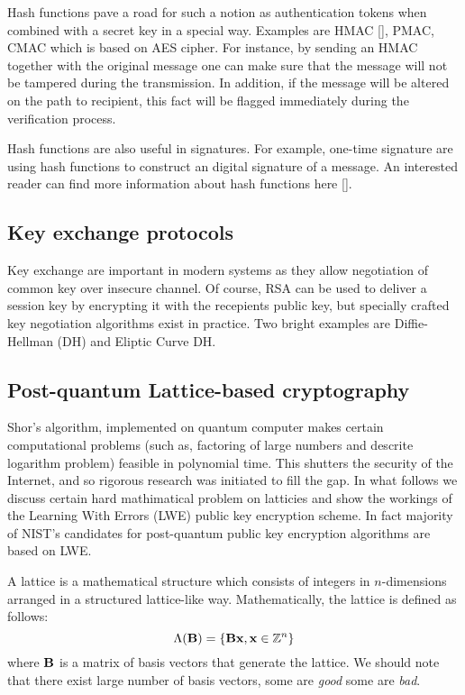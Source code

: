 Hash functions pave a road for such a notion as authentication tokens when combined with a 
secret key in a special way. Examples are HMAC [], PMAC, CMAC which is based on AES cipher. 
For instance, by sending an HMAC together with the original message one can make sure that 
the message will not be tampered during the transmission. In addition, if the message will 
be altered on the path to recipient, this fact will be flagged immediately during the 
verification process.

Hash functions are also useful in signatures. For example, one-time signature are using 
hash functions to construct an digital signature of a message. An interested reader can 
find more information about hash functions here [].

\subsection{Key exchange protocols}

Key exchange are important in modern systems as they allow negotiation of common 
key over insecure channel. Of course, RSA can be used to deliver a session key
by encrypting it with the recepients public key, but specially crafted key negotiation
algorithms exist in practice. Two bright examples are Diffie-Hellman (DH) and Eliptic Curve 
DH. 


\subsection{Post-quantum Lattice-based cryptography}

Shor's algorithm, implemented on quantum computer makes certain computational 
problems (such as, factoring of large numbers and descrite logarithm problem) 
feasible in polynomial time. This shutters the security of the Internet, and 
so rigorous research was initiated to fill the gap. In what follows we discuss
certain hard mathimatical problem on latticies and show the workings of the 
Learning With Errors (LWE) public key encryption scheme. In fact majority of 
NIST's candidates for post-quantum public key encryption algorithms are based 
on LWE.

A lattice is a mathematical structure which consists of integers in $n$-dimensions 
arranged in a structured lattice-like way. Mathematically, the lattice is defined as follows:
$$\Lambda({\bf B}) = \{{\bf Bx}, {\bf x} \in \mathbb{Z}^n \}$$ where ${\bf B}$ is a matrix of basis vectors
that generate the lattice. We should note that there exist large number of basis vectors, some are {\it good}
some are {\it bad}.

